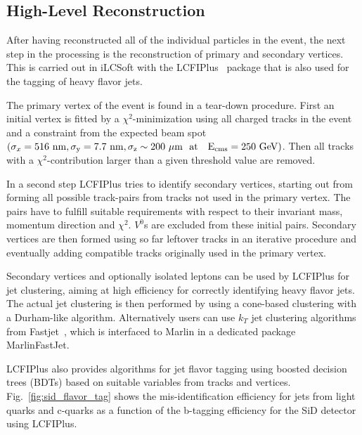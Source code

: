   

\subsection{\label{sub:sw-HLR}High-Level Reconstruction}

After having reconstructed all of the individual particles in the event, the next step in the processing is the reconstruction of
primary and secondary vertices. This is carried out in iLCSoft with the LCFIPlus~\cite{Suehara:2015ura} package that is also used
for the tagging of heavy flavor jets.

The primary vertex of the event is found in a tear-down procedure. First an initial vertex is fitted by a $\chi^2$-minimization using
all charged tracks in the event and a constraint from the expected beam spot
$(\sigma_x=516~\rm{nm}, \sigma_y=7.7~\rm{nm},\sigma_z \sim 200~\mu\rm{m}~~\rm{at}~~~E_{cms}=250~\rm{GeV})$.
Then all tracks with a $\chi^2$-contribution larger than a given threshold value are removed.

In a second step LCFIPlus tries to identify secondary vertices, starting out from forming all possible track-pairs from tracks not
used in the primary vertex. The pairs have to fulfill suitable requirements with respect to their invariant mass, momentum direction
and $\chi^2$. $V^0$s are excluded from these initial pairs. Secondary vertices are then formed using so far leftover tracks in
an iterative procedure and eventually adding compatible tracks originally used in the primary vertex.

Secondary vertices and optionally isolated leptons can be used by LCFIPlus for jet clustering, aiming at high efficiency for correctly identifying
heavy flavor jets. The actual jet clustering is then performed by using a cone-based clustering with a Durham-like algorithm.
Alternatively users can use $k_T$ jet clustering algorithms from
Fastjet~\cite{Cacciari:2006sm},
which is interfaced to Marlin in a dedicated
package MarlinFastJet.

LCFIPlus also provides algorithms for jet flavor tagging using boosted decision trees (BDTs) based on suitable variables from tracks and vertices.
Fig.~\ref{fig:sid_flavor_tag} shows the mis-identification efficiency for jets from light quarks and c-quarks as a function of the b-tagging efficiency
for the SiD detector using LCFIPlus.

